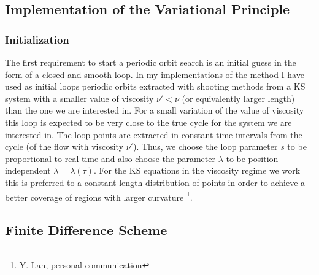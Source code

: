 \documentclass[pre,preprint,groupedaddress,showpacs,showkeys]{revtex4}
\begin{document}
 \subsection{Implementation of the Variational Principle}

  \subsubsection{Initialization}

    The first requirement to start a periodic orbit search is an initial guess in
    the form of a closed and smooth loop.
    In my implementations of the method I have used as initial loops periodic
    orbits extracted with shooting methods from a KS system with a smaller value of
    viscosity $\nu ' <\nu$ (or equivalently larger length) than the one we are interested
    in. For a small variation of the value
    of viscosity this loop is expected to be very close to the true cycle for the
    system we are interested in. The loop points are extracted in constant time intervals
    from the cycle (of the flow with viscosity $\nu'$). Thus, we choose the loop parameter
    $s$ to be proportional to real time and also choose the parameter $\lambda$ to be
    position independent $\lambda=\lambda(\tau)$. For the KS equations in the viscosity
    regime we work this is preferred to a constant
    length distribution of points in order to achieve a better coverage of regions
    with larger curvature \footnote{Y. Lan, personal communication}.

  \subsection{Finite Difference Scheme}
\end{document}
